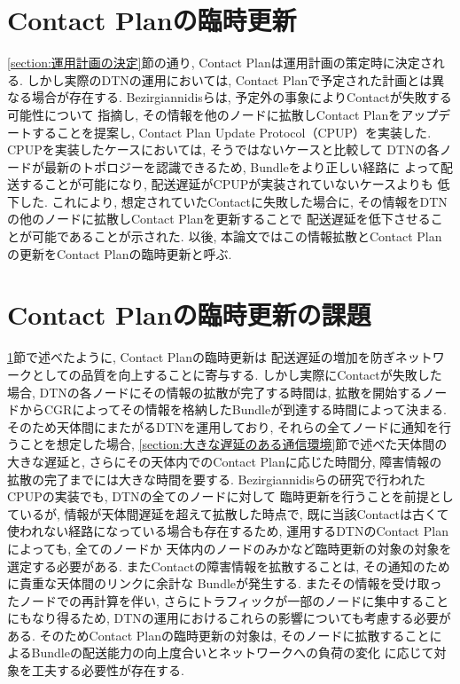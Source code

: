 \section{Contact Planの臨時更新}
\label{section:ContactPlanの臨時更新}
\ref{section:運用計画の決定}節の通り, Contact Planは運用計画の策定時に決定される.  
しかし実際のDTNの運用においては, Contact Planで予定された計画とは異なる場合が存在する.  
Bezirgiannidisらは, 予定外の事象によりContactが失敗する可能性について
指摘し, その情報を他のノードに拡散しContact Planをアップデートすることを提案し, 
Contact Plan Update Protocol（CPUP）を実装した\cite{Bezirgiannidis2013}.  
CPUPを実装したケースにおいては, そうではないケースと比較して
DTNの各ノードが最新のトポロジーを認識できるため, Bundleをより正しい経路に
よって配送することが可能になり, 配送遅延がCPUPが実装されていないケースよりも
低下した. これにより, 想定されていたContactに失敗した場合に, 
その情報をDTNの他のノードに拡散しContact Planを更新することで
配送遅延を低下させることが可能であることが示された. 
以後, 本論文ではこの情報拡散とContact Planの更新をContact Planの臨時更新と呼ぶ. 

\section{Contact Planの臨時更新の課題}
\label{section:ContactPlanの臨時更新の課題}
\ref{section:ContactPlanの臨時更新}節で述べたように, Contact Planの臨時更新は
配送遅延の増加を防ぎネットワークとしての品質を向上することに寄与する. 
しかし実際にContactが失敗した場合, DTNの各ノードにその情報の拡散が完了する時間は, 
拡散を開始するノードからCGRによってその情報を格納したBundleが到達する時間によって決まる.  
そのため天体間にまたがるDTNを運用しており, それらの全てノードに通知を行うことを想定した場合, 
\ref{section:大きな遅延のある通信環境}節で述べた天体間の大きな遅延と, 
さらにその天体内でのContact Planに応じた時間分, 障害情報の拡散の完了までには大きな時間を要する.  
Bezirgiannidisらの研究で行われたCPUPの実装でも, DTNの全てのノードに対して
臨時更新を行うことを前提としているが, 情報が天体間遅延を超えて拡散した時点で, 
既に当該Contactは古くて使われない経路になっている場合も存在するため, 
運用するDTNのContact Planによっても, 全てのノードか
天体内のノードのみかなど臨時更新の対象の対象を選定する必要がある.  
またContactの障害情報を拡散することは, その通知のために貴重な天体間のリンクに余計な
Bundleが発生する. またその情報を受け取ったノードでの再計算を伴い, 
さらにトラフィックが一部のノードに集中することにもなり得るため, 
DTNの運用におけるこれらの影響についても考慮する必要がある. 
そのためContact Planの臨時更新の対象は,
そのノードに拡散することによるBundleの配送能力の向上度合いとネットワークへの負荷の変化
に応じて対象を工夫する必要性が存在する.  